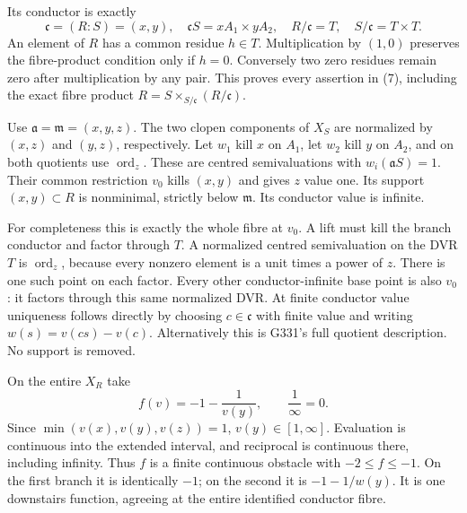 Its conductor is exactly
\[
 \mathfrak c=(R:S)=(x,y),\quad
 \mathfrak cS=xA_1\times yA_2,\quad
 R/\mathfrak c=T,\quad S/\mathfrak c=T\times T.                  \tag{7}
\]
An element of \(R\) has a common residue \(h\in T\). Multiplication
by \((1,0)\) preserves the fibre-product condition only if \(h=0\).
Conversely two zero residues remain zero after multiplication by
any pair. This proves every assertion in (7), including the exact
fibre product \(R=S\times_{S/\mathfrak c}(R/\mathfrak c)\).

Use \(\mathfrak a=\mathfrak m=(x,y,z)\).
The two clopen components of \(X_S\) are normalized by
\((x,z)\) and \((y,z)\), respectively. Let \(w_1\) kill \(x\) on
\(A_1\), let \(w_2\) kill \(y\) on \(A_2\), and on both quotients
use \(\operatorname{ord}_z\). These are centred semivaluations
with \(w_i(\mathfrak aS)=1\).
Their common restriction \(v_0\) kills \((x,y)\) and gives \(z\)
value one. Its support \((x,y)\subset R\) is nonminimal, strictly
below \(\mathfrak m\). Its conductor value is infinite.

For completeness this is exactly the whole fibre at \(v_0\).
A lift must kill the branch conductor and factor through \(T\).
A normalized centred semivaluation on the DVR \(T\) is
\(\operatorname{ord}_z\), because every nonzero element is a unit
times a power of \(z\). There is one such point on each factor.
Every other conductor-infinite base point is also \(v_0\):
it factors through this same normalized DVR.
At finite conductor value uniqueness follows directly by choosing
\(c\in\mathfrak c\) with finite value and writing
\(w(s)=v(cs)-v(c)\). Alternatively this is G331's full quotient
description. No support is removed.

On the entire \(X_R\) take
\[
 f(v)=-1-\frac1{v(y)},\qquad \frac1\infty=0.                    \tag{8}
\]
Since \(\min(v(x),v(y),v(z))=1\), \(v(y)\in[1,\infty]\).
Evaluation is continuous into the extended interval, and reciprocal
is continuous there, including infinity. Thus \(f\) is a finite
continuous obstacle with \(-2\leq f\leq-1\).
On the first branch it is identically \(-1\); on the second it is
\(-1-1/w(y)\). It is one downstairs function, agreeing at the
entire identified conductor fibre.

